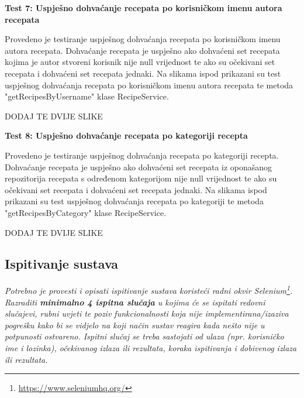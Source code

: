 		
	
		
		\textbf{Test 7: Uspješno dohvaćanje recepata po korisničkom imenu autora recepata}
		
		Provedeno je testiranje uspješnog dohvaćanja recepata po korisničkom imenu autora recepata. Dohvaćanje recepata je uspješno ako dohvaćeni set recepata kojima je autor stvoreni korisnik nije null vrijednost te ako su očekivani set recepata i dohvaćeni set recepata jednaki. Na slikama ispod prikazani su test uspješnog dohvaćanja recepata po korisničkom imenu autora recepata te metoda "getRecipesByUsername" klase RecipeService.
		
		DODAJ TE DVIJE SLIKE
		
		
		\textbf{Test 8: Uspješno dohvaćanje recepata po kategoriji recepta}
		
		Provedeno je testiranje uspješnog dohvaćanja recepata po kategoriji recepta. Dohvaćanje recepata je uspješno ako dohvaćeni set recepata iz oponašanog repozitorija recepata s određenom kategorijom nije null vrijednost te ako su očekivani set recepata i dohvaćeni set recepata jednaki. Na slikama ispod prikazani su test uspješnog dohvaćanja recepata po kategoriji te metoda "getRecipesByCategory" klase RecipeService.
		
		DODAJ TE DVIJE SLIKE

		
		

















			
			
			
			\subsection{Ispitivanje sustava}
			
			 \textit{Potrebno je provesti i opisati ispitivanje sustava koristeći radni okvir Selenium\footnote{\url{https://www.seleniumhq.org/}}. Razraditi \textbf{minimalno 4 ispitna slučaja} u kojima će se ispitati redovni slučajevi, rubni uvjeti te poziv funkcionalnosti koja nije implementirana/izaziva pogrešku kako bi se vidjelo na koji način sustav reagira kada nešto nije u potpunosti ostvareno. Ispitni slučaj se treba sastojati od ulaza (npr. korisničko ime i lozinka), očekivanog izlaza ili rezultata, koraka ispitivanja i dobivenog izlaza ili rezultata.\\ }
			 
